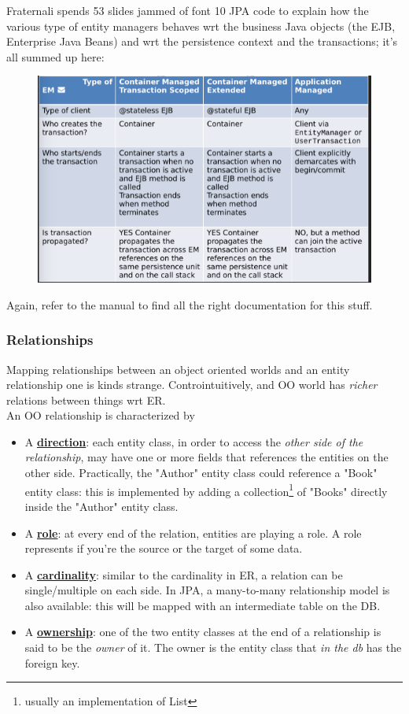 \documentclass{article}
\begin{document}
					Fraternali spends 53 slides jammed of font 10 JPA code to explain how the various type of entity managers behaves wrt the business Java objects (the EJB, Enterprise Java Beans) and wrt the persistence context and the transactions; it's all summed up here:
					\begin{figure}[H]
						\centering
						\includegraphics[width = \textwidth]{./images/EMTypes.png}
					\end{figure}
					Again, refer to the manual to find all the right documentation for this stuff.

			\subsubsection{Relationships}
				Mapping relationships between an object oriented worlds and an entity relationship one is kinds strange. Controintuitively, and OO world has \textit{richer} relations between things wrt ER.\\
				An OO relationship is characterized by
				\begin{itemize}
					\item A \textbf{\underline{direction}}: each entity class, in order to access the \textit{other side of the relationship}, may have one or more fields that references the entities on the other side. Practically, the "Author" entity class could reference a "Book" entity class: this is implemented by adding a collection\footnote{usually an implementation of List} of "Books" directly inside the "Author" entity class.
					\item A \textbf{\underline{role}}: at every end of the relation, entities are playing a role. A role represents if you're the source or the target of some data.
					\item A \textbf{\underline{cardinality}}: similar to the cardinality in ER, a relation can be single/multiple on each side. In JPA, a many-to-many relationship model is also available: this will be mapped with an intermediate table on the DB. 
					\item A \textbf{\underline{ownership}}: one of the two entity classes at the end of a relationship is said to be the \textit{owner} of it. The owner is the entity class that \textit{in the db} has the foreign key.
				\end{itemize}
\end{document}
